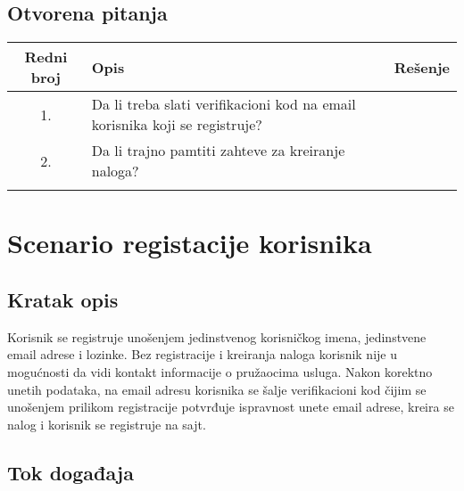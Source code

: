\documentclass[a4paper,12pt]{report}
\newcommand{\genitivfunkcionalnosti}{registacije korisnika}
\begin{document}
\subsection{Otvorena pitanja}
    \begin{center}
    \begin{tabular}{ |c|p{10cm}|l| }
    \hline
    \textbf{Redni broj} & \hspace{4cm} \textbf{Opis} & \textbf{Rešenje} \\ 
    \hline
         1. & Da li treba slati verifikacioni kod na email 
         korisnika koji se registruje? & \\
         \hline
          2.& Da li trajno pamtiti zahteve za kreiranje naloga? &  \\
         \hline
         & &   \\ 
         \hline
    \end{tabular}
    \end{center}
    
\section{Scenario \genitivfunkcionalnosti}
\subsection{Kratak opis}
    Korisnik se registruje unošenjem jedinstvenog korisničkog imena, jedinstvene email adrese i lozinke. Bez registracije i kreiranja naloga korisnik nije u mogućnosti da vidi kontakt informacije o pružaocima usluga. Nakon korektno unetih podataka, na email adresu korisnika se šalje verifikacioni kod čijim se unošenjem prilikom registracije potvrđuje ispravnost unete email adrese, kreira se nalog i korisnik se registruje na sajt. 
    \newpage
\subsection{Tok događaja}
\end{document}
